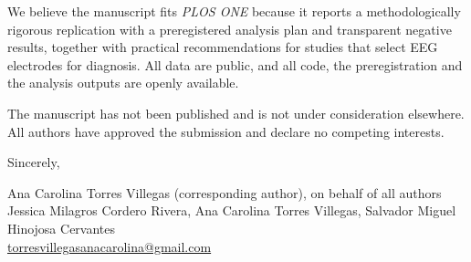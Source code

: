 \documentclass[11pt,letterpaper]{article}
\begin{document}
We believe the manuscript fits \textit{PLOS ONE} because it reports a methodologically rigorous replication with a preregistered analysis plan and transparent negative results, together with practical recommendations for studies that select EEG electrodes for diagnosis. All data are public, and all code, the preregistration and the analysis outputs are openly available.

The manuscript has not been published and is not under consideration elsewhere. All authors have approved the submission and declare no competing interests.

Sincerely,

Ana Carolina Torres Villegas (corresponding author), on behalf of all authors\\
Jessica Milagros Cordero Rivera, Ana Carolina Torres Villegas, Salvador Miguel Hinojosa Cervantes\\
\href{mailto:torresvillegasanacarolina@gmail.com}{torresvillegasanacarolina@gmail.com}
\end{document}
